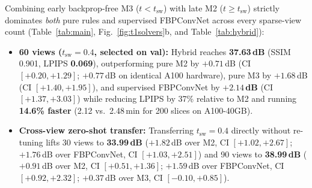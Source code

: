 \documentclass[11pt]{article}
\newcommand{\A}{\mathcal{A}}
\newcommand{\x}{\bm{x}}
\newcommand{\y}{\bm{y}}
\begin{document}
\begin{table}[t]
\centering
\caption{Complete 6-protocol single-sample reconstruction benchmark on \emph{test200} ($\mathrm{NFE}{=}50$). PSNR includes patient-level 95\% bootstrap CIs; SSIM is computed inside the reconstruction disk; $\mathrm{DC}=\|\A(\hat\x)-\y\|_2/\|\y\|_2$. Best metric per protocol in bold; best unconditional flow PSNR underlined when supervised FBPConvNet leads.}
\label{tab:main}
\footnotesize
\setlength{\tabcolsep}{4pt}
\resizebox{\linewidth}{!}{%
}
\end{table}

Combining early backprop-free M3 ($t{<}t_{\mathrm{sw}}$) with late M2 ($t{\ge}t_{\mathrm{sw}}$) strictly dominates \emph{both} pure rules and supervised FBPConvNet across every sparse-view count (Table~\ref{tab:main}, Fig.~\ref{fig:t1solvers}b, and Table~\ref{tab:hybrid}):
\begin{itemize}[leftmargin=*,nosep]
  \item \textbf{60 views ($t_{\mathrm{sw}}{=}0.4$, selected on val):} Hybrid reaches \textbf{37.63\,dB} (SSIM 0.901, LPIPS \textbf{0.069}), outperforming pure M2 by $+0.71$\,dB (CI $[+0.20,+1.29]$; $+0.77$\,dB on identical A100 hardware), pure M3 by $+1.68$\,dB (CI $[+1.40,+1.95]$), and supervised FBPConvNet by \textbf{$+2.14$\,dB} (CI $[+1.37,+3.03]$) while reducing LPIPS by 37\% relative to M2 and running \textbf{14.6\% faster} (2.12 vs.\ 2.48\,min for 200 slices on A100-40GB).
  \item \textbf{Cross-view zero-shot transfer:} Transferring $t_{\mathrm{sw}}{=}0.4$ directly without re-tuning lifts 30 views to \textbf{33.99\,dB} ($+1.82$\,dB over M2, CI $[+1.02,+2.67]$; $+1.76$\,dB over FBPConvNet, CI $[+1.03,+2.51]$) and 90 views to \textbf{38.99\,dB} ($+0.91$\,dB over M2, CI $[+0.51,+1.36]$; $+1.59$\,dB over FBPConvNet, CI $[+0.92,+2.32]$; $+0.37$\,dB over M3, CI $[-0.10,+0.85]$).
\end{itemize}
\end{document}
